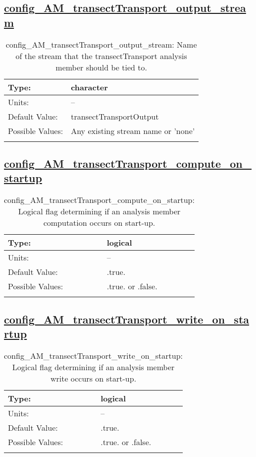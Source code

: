 \subsection[config\_AM\_transectTransport\_output\_stream]{\hyperref[sec:nm_tab_AM_transectTransport]{config\_AM\_transectTransport\_output\_stream}}
\label{subsec:nm_sec_config_AM_transectTransport_output_stream}
\begin{center}
\begin{longtable}{| p{2.0in} || p{4.0in} |}
    \hline
    Type: & character \\
    \hline
    Units: & -- \\
    \hline
    Default Value: & transectTransportOutput \\
    \hline
    Possible Values: & Any existing stream name or 'none' \\
    \hline
    \caption{config\_AM\_transectTransport\_output\_stream: Name of the stream that the transectTransport analysis member should be tied to.}
\end{longtable}
\end{center}
\subsection[config\_AM\_transectTransport\_compute\_on\_startup]{\hyperref[sec:nm_tab_AM_transectTransport]{config\_AM\_transectTransport\_compute\_on\_startup}}
\label{subsec:nm_sec_config_AM_transectTransport_compute_on_startup}
\begin{center}
\begin{longtable}{| p{2.0in} || p{4.0in} |}
    \hline
    Type: & logical \\
    \hline
    Units: & -- \\
    \hline
    Default Value: & .true. \\
    \hline
    Possible Values: & .true. or .false. \\
    \hline
    \caption{config\_AM\_transectTransport\_compute\_on\_startup: Logical flag determining if an analysis member computation occurs on start-up.}
\end{longtable}
\end{center}
\subsection[config\_AM\_transectTransport\_write\_on\_startup]{\hyperref[sec:nm_tab_AM_transectTransport]{config\_AM\_transectTransport\_write\_on\_startup}}
\label{subsec:nm_sec_config_AM_transectTransport_write_on_startup}
\begin{center}
\begin{longtable}{| p{2.0in} || p{4.0in} |}
    \hline
    Type: & logical \\
    \hline
    Units: & -- \\
    \hline
    Default Value: & .true. \\
    \hline
    Possible Values: & .true. or .false. \\
    \hline
    \caption{config\_AM\_transectTransport\_write\_on\_startup: Logical flag determining if an analysis member write occurs on start-up.}
\end{longtable}
\end{center}
